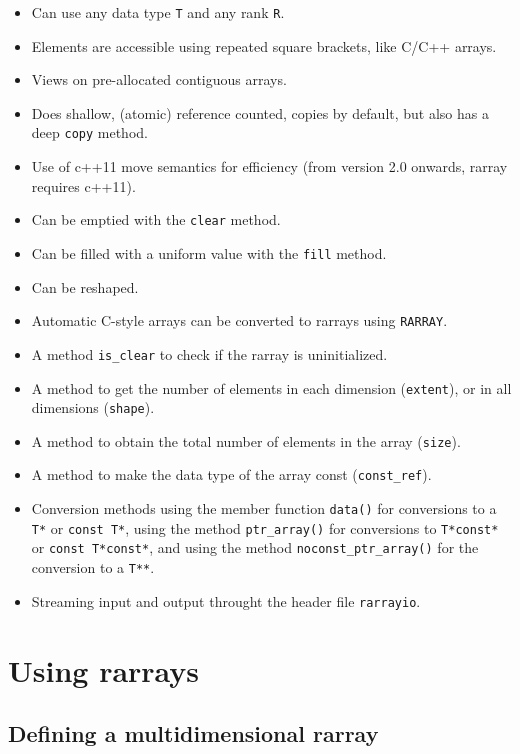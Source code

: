 \documentclass[11pt,twoside]{article}
\begin{document}
\begin{itemize}\itemsep0pt\parskip2pt
\item Can use any data type {\tt T} and any rank {\tt R}.
\item Elements are accessible using repeated square brackets, like C/C++ arrays.
\item Views on pre-allocated contiguous arrays.
\item Does shallow, (atomic) reference counted, copies by default, but also has a deep {\tt copy}
  method.
\item Use of c++11 move semantics for efficiency (from version 2.0
  onwards, rarray requires c++11).
\item Can be emptied with the {\tt clear} method.
\item Can be filled with a uniform value with the {\tt fill} method.
\item Can be reshaped.
\item Automatic C-style arrays can be converted to rarrays using {\tt RARRAY}.
\item A method {\tt is\_clear} to check if the rarray is uninitialized.
\item A method to get the number of elements in each
  dimension (\texttt{extent}), or in all dimensions (\texttt{shape}).
\item A method to obtain the total number of elements in the
  array (\texttt{size}).
\item A method to make the data type of the array const
  (\texttt{const\_ref}).
\item Conversion methods using the member
  function \texttt{data()} for conversions to a \texttt{T*} or
  \texttt{const T*}, using the method \texttt{ptr\_array()} for
  conversions to \texttt{T*const*} or \texttt{const T*const*}, and
  using the method \texttt{noconst\_ptr\_array()} for the conversion to a
  \texttt{T**}.
\item Streaming input and output throught the header file \texttt{rarrayio}.
\end{itemize}

\section{Using rarrays}

\subsection{Defining a multidimensional rarray}
\label{definerarray}
\end{document}

